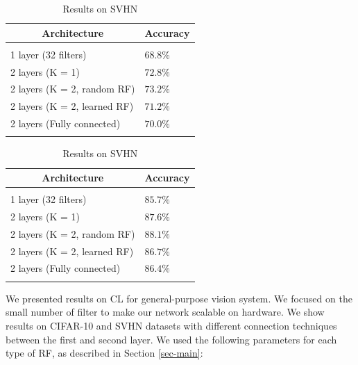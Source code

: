 \documentclass{article} %
\begin{document}
\begin {table}
\parbox{.5\linewidth}{
\caption{Results on CIFAR-10}
\label{tab:results-cifar10}
\begin{center}
\vspace*{-8pt}
\begin{tabular}{ll}
\multicolumn{1}{c}{\bf Architecture}  &\multicolumn{1}{c}{\bf Accuracy}
 \\ \hline \hline \\
1 layer (32 filters)			& $68.8\%$\\
2 layers (K = 1)				&$72.8\%$ \\
2 layers (K = 2, random RF)	&$73.2\%$ \\
2 layers (K = 2, learned RF)	&$71.2\%$\\
2 layers (Fully connected)		&$70.0\%$\\
\\ \hline  \hline
\end{tabular}
\vspace*{-15pt}
\end{center}
}
\parbox{.5\linewidth}{
\caption{Results on SVHN}
\label{tab:results-svhn}
\begin{center}
\vspace*{-8pt}
\begin{tabular}{ll}
\multicolumn{1}{c}{\bf Architecture}  &\multicolumn{1}{c}{\bf Accuracy}
\\ \hline \hline \\
1 layer (32 filters)			& $85.7\%$\\
2 layers (K = 1)                           &$87.6\%$ \\
2 layers (K = 2, random RF)	&$88.1\%$ \\
2 layers (K = 2, learned RF)	&$86.7\%$\\
2 layers (Fully connected)		&$86.4\%$\\
\\ \hline \hline
\end{tabular}
\vspace*{-15pt}
\end{center}
}
\end{table}



We presented results on CL for general-purpose vision system. We focused on the small number of filter to make our network scalable on hardware. We show results on CIFAR-10 and SVHN datasets with different connection techniques between the first and second layer.  We used the following parameters for each type of RF, as described in Section \ref{sec-main}:
\end{document}
